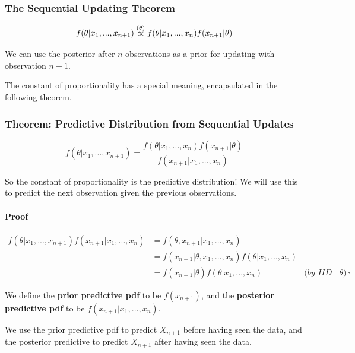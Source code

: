 \documentclass[a4paper]{article}
\begin{document}
            \subsubsection{The Sequential Updating Theorem}
                \[
                    f(\theta | x_1, ..., x_{n+1}) \stackrel{({\theta})}{\propto} f(\theta |
                    x_1, ..., x_n) f(x_{n+1} | \theta)
                \]

                We can use the posterior after $n$ observations as a prior for
                updating with observation $n + 1$.

                The constant of proportionality has a special meaning,
                encapsulated in the following theorem.

            \subsubsection{Theorem: Predictive Distribution from Sequential
            Updates}
                \[
                    f(\theta | x_1, ..., x_{n + 1}) = \frac{f(\theta | x_1, ...,
                    x_n)f(x_{n+1} | \theta)}{f(x_{n+1} | x_1, ..., x_n)}
                \]

                So the constant of proportionality is the predictive
                distribution! We will use this to predict the next observation
                given the previous observations.

                \paragraph{Proof}
                    \begin{align*}
                        f(\theta | x_1, ..., x_{n+1}) f(x_{n+1} | x_1, ..., x_n)
                            & = f(\theta, x_{n+1} | x_1, ..., x_n) \\
                        & = f(x_{n+1} | \theta, x_1, ..., x_n) f(\theta | x_1,
                            ..., x_n) \\
                        & = f(x_{n+1} | \theta) f(\theta | x_1, ..., x_n) &
                            \textit{(by IID on $\theta$)} \quad \square
                    \end{align*}

                \begin{definition}
                    We define the \textbf{prior predictive pdf} to be
                    $f(x_{n+1})$, and the \textbf{posterior predictive pdf} to
                    be $f(x_{n+1} | x_1, ..., x_n)$.

                    We use the prior predictive pdf to predict $X_{n+1}$ before
                    having seen the data, and the posterior predictive to
                    predict $X_{n + 1}$ after having seen the data.
                \end{definition}
\end{document}
